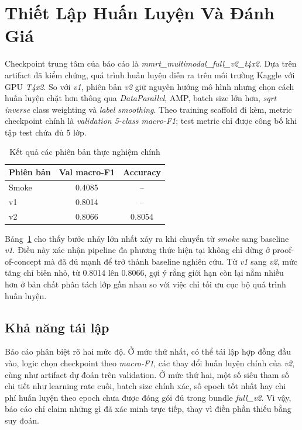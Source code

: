\documentclass[conference,a4paper]{IEEEtran}
\begin{document}
\section[Thiet Lap Huan Luyen Va Danh Gia]{Thiết Lập Huấn Luyện Và Đánh Giá}
Checkpoint trung tâm của báo cáo là \textit{mmrt\_multimodal\_full\_v2\_t4x2}. Dựa trên artifact đã kiểm chứng, quá trình huấn luyện diễn ra trên môi trường Kaggle với GPU \textit{T4x2}. So với \textit{v1}, phiên bản \textit{v2} giữ nguyên hướng mô hình nhưng chọn cách huấn luyện chặt hơn thông qua \textit{DataParallel}, AMP, batch size lớn hơn, \textit{sqrt inverse} class weighting và \textit{label smoothing}. Theo training scaffold đi kèm, metric checkpoint chính là \textit{validation 5-class macro-F1}; test metric chỉ được công bố khi tập test chứa đủ 5 lớp.

\begin{table}[t]
\caption{Kết quả các phiên bản thực nghiệm chính}
\label{tab:main-results}
\centering
\small
\begin{tabular}{lcc}
\toprule
Phiên bản & Val macro-F1 & Accuracy \\
\midrule
Smoke & 0.4085 & -- \\
v1 & 0.8014 & -- \\
v2 & 0.8066 & 0.8054 \\
\bottomrule
\end{tabular}
\end{table}

Bảng~\ref{tab:main-results} cho thấy bước nhảy lớn nhất xảy ra khi chuyển từ \textit{smoke} sang baseline \textit{v1}. Điều này xác nhận pipeline đa phương thức hiện tại không chỉ dừng ở proof-of-concept mà đã đủ mạnh để trở thành baseline nghiên cứu. Từ \textit{v1} sang \textit{v2}, mức tăng chỉ biên nhỏ, từ 0.8014 lên 0.8066, gợi ý rằng giới hạn còn lại nằm nhiều hơn ở bản chất phân tách lớp gần nhau so với việc chỉ tối ưu cục bộ quá trình huấn luyện.

\subsection{Khả năng tái lập}
Báo cáo phân biệt rõ hai mức độ. Ở mức thứ nhất, có thể tái lập hợp đồng đầu vào, logic chọn checkpoint theo \textit{macro-F1}, các thay đổi huấn luyện chính của \textit{v2}, cùng như artifact dự đoán trên validation. Ở mức thứ hai, một số siêu tham số chi tiết như learning rate cuối, batch size chính xác, số epoch tốt nhất hay chi phí huấn luyện theo epoch chưa được đóng gói đủ trong bundle \textit{full\_v2}. Vì vậy, báo cáo chỉ claim những gì đã xác minh trực tiếp, thay vì điền phần thiếu bằng suy đoán.
\end{document}
